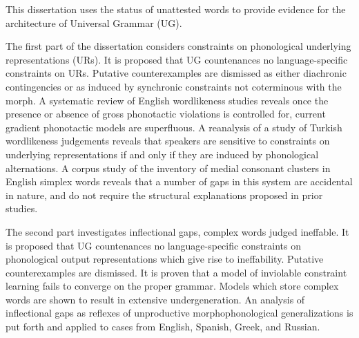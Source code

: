 This dissertation uses the status of unattested words to provide evidence for the architecture of Universal Grammar (UG).

The first part of the dissertation considers constraints on phonological underlying representations (URs). It is proposed that UG countenances no language-specific constraints on URs. Putative counterexamples are dismissed as either diachronic contingencies or as induced by synchronic constraints not coterminous with the morph. A systematic review of English wordlikeness studies reveals once the presence or absence of gross phonotactic violations is controlled for, current gradient phonotactic models are superfluous. A reanalysis of a study of Turkish wordlikeness judgements reveals that speakers are sensitive to constraints on underlying representations if and only if they are induced by phonological alternations. A corpus study of the inventory of medial consonant clusters in English simplex words reveals that a number of gaps in this system are accidental in nature, and do not require the structural explanations proposed in prior studies. 

The second part investigates inflectional gaps, complex words judged ineffable. It is proposed that UG countenances no language-specific constraints on phonological output representations which give rise to ineffability. Putative counterexamples are dismissed.
It is proven that a model of inviolable constraint learning fails to converge on the proper grammar. Models which store complex words are shown to result in extensive undergeneration. An analysis of inflectional gaps as reflexes of unproductive morphophonological generalizations is put forth and applied to cases from English, Spanish, Greek, and Russian.
